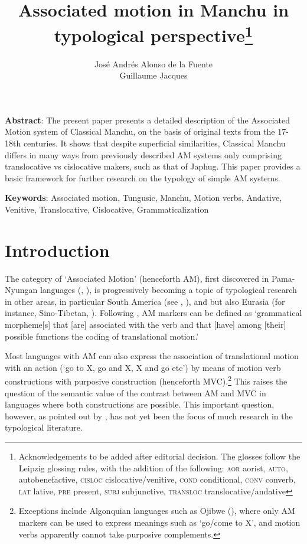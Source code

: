\documentclass{article}
\begin{document}
 
\title{Associated motion in Manchu in typological perspective\footnote{Acknowledgements to be added after editorial decision. The glosses follow the Leipzig glossing rules, with the addition of the following: \textsc{aor} aorist, \textsc{auto}, autobenefactive, \textsc{cisloc} cislocative/venitive, \textsc{cond} conditional, \textsc{conv} converb, \textsc{lat} lative,  \textsc{pre} present, \textsc{subj} subjunctive, \textsc{transloc} translocative/andative } }
\author{José Andrés Alonso de la Fuente\\Guillaume Jacques}
\maketitle 
\textbf{Abstract}: The present paper presents a detailed description of the Associated Motion system of Classical Manchu, on the basis of original texts from the 17-18th centuries. It shows that despite superficial similarities, Classical Manchu differs in many ways from previously described AM systems only comprising translocative vs cislocative makers, such as that of Japhug. This paper provides a basic framework for further research on the typology of simple AM systems.

\textbf{Keywords}: Associated motion, Tungusic, Manchu, Motion verbs, Andative, Venitive, Translocative, Cislocative, Grammaticalization

\section*{Introduction}
The category of `Associated Motion' (henceforth AM), first discovered in Pama-Nyungan languages (\citealt{koch84associated.motion}, \citealt{wilkins91associated.motion}), is progressively becoming a topic of typological research in other areas, in particular South America (see \citealt{guillaume08cavinena}, \citealt{guillaume16am}), and but also Eurasia (for instance, Sino-Tibetan, \citealt{jacques13harmonization}). Following \citet[12]{guillaume16am}, AM markers can be defined as `grammatical morpheme[s] that [are] associated with the verb
and that [have] among [their] possible functions the coding of translational
motion.'

Most languages with AM can also express the association of translational motion with an action (`go to X, go and X, X and go etc')  by means of motion verb constructions with purposive construction (henceforth MVC).\footnote{Exceptions include Algonquian languages such as Ojibwe (\citealt[729-733]{valentine01grammar}), where only AM markers can be used to express meanings such as `go/come to X', and motion verbs apparently cannot take purposive complements.} This raises the question of the semantic value of the contrast between AM and MVC in languages where both constructions are possible. This important question, however, as pointed out by \citet[10]{guillaume16am}, has not yet been the focus of much research in the typological literature.
\end{document}
